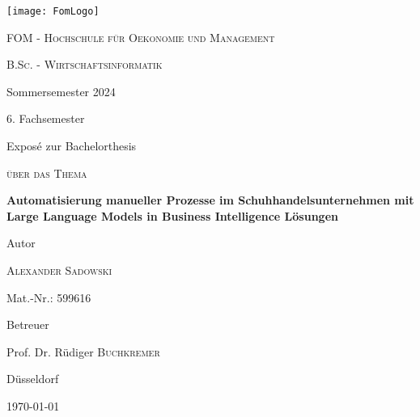 
\begin{titlepage}
	
	\centering
	\texttt{[image: FomLogo]}\par\vspace{1cm}
	{\scshape\LARGE FOM - Hochschule für Oekonomie und Management \par}
	\vspace{1cm}
	{\scshape B.Sc. - Wirtschaftsinformatik\par Sommersemester 2024\par 6. Fachsemester\par Exposé zur Bachelorthesis\par}
	\vspace{1cm}
	{\scshape über das Thema\par}
	\vspace{1cm}
	{\large\bfseries Automatisierung manueller Prozesse im Schuhhandelsunternehmen mit Large Language Models in Business Intelligence Lösungen\par}
	\vspace{1.5cm}
	Autor\par
	{\large\textsc{Alexander Sadowski}\par}
	Mat.-Nr.: 599616\par
	\vfill
	Betreuer\par
	Prof. Dr. Rüdiger \textsc{Buchkremer}
	
	\vfill
	
	{Düsseldorf\par \today \par}
\end{titlepage}